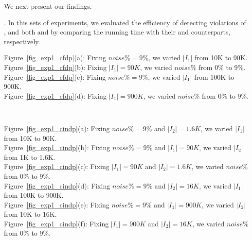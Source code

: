 We next present our findings.

. In this sets of experiments, we evaluated the efficiency of detecting violations of \pCFDs, \pCINDs and both \pCFDs and \pCINDs by comparing the running time with their \CFDs and \CINDs counterparts, respectively.

\begin{figure*}
  \centering
  \quad
  \quad
  \quad
  \caption{Efficiency of detecting \pCFD violations}\label{fig_exp1_cfdp}
\end{figure*}

\noindent Figure~\ref{fig_exp1_cfdp}(a): Fixing $noise\% = 9\%$, we varied $|I_1|$ from 10K to 90K.    \\
Figure~\ref{fig_exp1_cfdp}(b): Fixing $|I_1|=90K$, we varied $noise\%$ from 0\% to 9\%.\\
Figure~\ref{fig_exp1_cfdp}(c): Fixing $noise\% = 9\%$, we varied $|I_1|$ from 100K to 900K.  \\
Figure~\ref{fig_exp1_cfdp}(d): Fixing $|I_1|=900K$, we varied $noise\%$ from 0\% to 9\%.  \\


\begin{figure*}
  \centering
  \quad
  \quad
  \quad \\
  \quad
  \quad
  \caption{Efficiency of detecting \pCIND violations}\label{fig_exp1_cindp}
\end{figure*}

\noindent Figure~\ref{fig_exp1_cindp}(a): Fixing $noise\% = 9\%$ and $|I_2| = 1.6K$, we varied $|I_1|$ from 10K to 90K. \\
Figure~\ref{fig_exp1_cindp}(b): Fixing $noise\% = 9\%$ and $|I_1| = 90K$, we varied $|I_2|$ from 1K to 1.6K.\\
Figure~\ref{fig_exp1_cindp}(c): Fixing $|I_1| = 90K$ and $|I_2| = 1.6K$, we varied $noise\%$ from 0\% to 9\%.\\
Figure~\ref{fig_exp1_cindp}(d): Fixing $noise\% = 9\%$ and $|I_2| = 16K$, we varied $|I_1|$ from 100K to 900K.\\
Figure~\ref{fig_exp1_cindp}(e): Fixing $noise\% = 9\%$ and $|I_1| = 900K$, we varied $|I_2|$ from 10K to 16K.\\
Figure~\ref{fig_exp1_cindp}(f): Fixing $|I_1| = 900K$ and $|I_2| = 16K$, we varied $noise\%$ from 0\% to 9\%.\\


